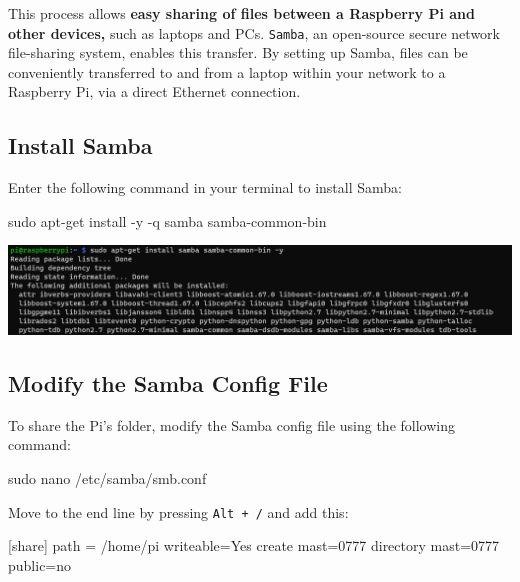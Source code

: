 \documentclass[
  letterpaper,
]{scrbook}
\newenvironment{Shaded}{\begin{snugshade}}{\end{snugshade}}
\newcommand{\AttributeTok}[1]{\textcolor[rgb]{0.40,0.45,0.13}{#1}}
\newcommand{\DataTypeTok}[1]{\textcolor[rgb]{0.68,0.00,0.00}{#1}}
\newcommand{\DecValTok}[1]{\textcolor[rgb]{0.68,0.00,0.00}{#1}}
\newcommand{\FunctionTok}[1]{\textcolor[rgb]{0.28,0.35,0.67}{#1}}
\newcommand{\NormalTok}[1]{\textcolor[rgb]{0.00,0.23,0.31}{#1}}
\newcommand{\OperatorTok}[1]{\textcolor[rgb]{0.37,0.37,0.37}{#1}}
\begin{document}
This process allows \textbf{easy sharing of files between a Raspberry Pi
and other devices,} such as laptops and PCs. \texttt{Samba}, an
open-source secure network file-sharing system, enables this transfer.
By setting up Samba, files can be conveniently transferred to and from a
laptop within your network to a Raspberry Pi, via a direct Ethernet
connection.

\subsection{Install Samba}\label{install-samba}

Enter the following command in your terminal to install Samba:

\begin{Shaded}
\begin{Highlighting}[]
\FunctionTok{sudo}\NormalTok{ apt{-}get install }\AttributeTok{{-}y} \AttributeTok{{-}q}\NormalTok{ samba samba{-}common{-}bin}
\end{Highlighting}
\end{Shaded}

\includegraphics{content/material/ch2/install_samba.png}

\subsection{Modify the Samba Config
File}\label{modify-the-samba-config-file}

To share the Pi's folder, modify the Samba config file using the
following command:

\begin{Shaded}
\begin{Highlighting}[]
\FunctionTok{sudo}\NormalTok{ nano /etc/samba/smb.conf}
\end{Highlighting}
\end{Shaded}

Move to the end line by pressing \texttt{Alt\ +\ /} and add this:

\begin{Shaded}
\begin{Highlighting}[]
\OperatorTok{[}\NormalTok{share}\OperatorTok{]}
\NormalTok{path }\OperatorTok{=} \OperatorTok{/}\NormalTok{home}\OperatorTok{/}\NormalTok{pi}
\NormalTok{writeable}\OperatorTok{=}\NormalTok{Yes}
\NormalTok{create mast}\OperatorTok{=}\DecValTok{0777}
\DataTypeTok{directory}\NormalTok{ mast}\OperatorTok{=}\DecValTok{0777}
\DataTypeTok{public}\OperatorTok{=}\NormalTok{no}
\end{Highlighting}
\end{Shaded}
\end{document}
